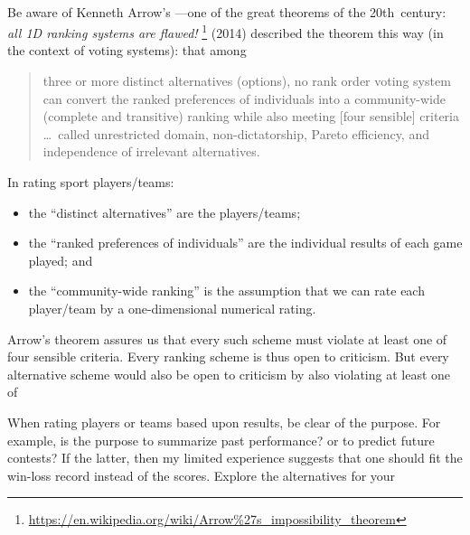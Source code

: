 \begin{table}
\begin{minipage}{\linewidth}
\hrulefill\\
Be aware of Kenneth Arrow's  \cite[]{Arrow50}---one of the great theorems of the 20th~century: \emph{all 1D ranking systems are flawed!}  
\footnote{\protect\url{https://en.wikipedia.org/wiki/Arrow\%27s\_impossibility\_theorem}}
 (2014) described the theorem this way (in the context of voting systems): that among 
\begin{quote}
three or more distinct alternatives (options), no rank order voting system can convert the ranked preferences of individuals into a community-wide (complete and transitive) ranking while also meeting [four sensible] criteria \ldots\ called unrestricted domain, non-dictatorship, Pareto efficiency, and independence of irrelevant alternatives.
\end{quote}
In rating sport players\slash teams:
\begin{itemize}
\item the ``distinct alternatives'' are the players\slash teams;
\item  the ``ranked preferences of individuals'' are the individual results of each game played; and 
\item the ``community-wide ranking'' is the assumption that we can rate each player\slash team by a one-dimensional numerical rating.
\end{itemize}
Arrow's theorem assures us that every such scheme must violate at least one of four sensible criteria.
Every ranking scheme is thus open to criticism. 
But every alternative scheme would also be open to criticism by also violating at least one of 
\end{minipage}
\end{table}


When rating players or teams based upon results, be clear of the purpose.  
For example, is the purpose to summarize past performance? or to predict future contests?  
If the latter, then my limited experience suggests that one should fit the win-loss record instead of the scores.
Explore the alternatives for your 




\begin{comment}
Further applications include least square regression  \larsvii{p.92--4*} \holti{p.399--401}, least square approximations, and Fourier series \larsvii{p.275--281}.
\end{comment}



